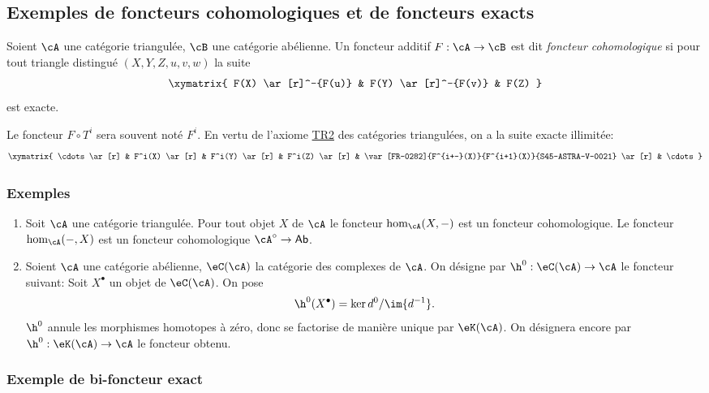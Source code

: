 \subsection{Exemples de foncteurs cohomologiques et de foncteurs exacts}\label{VIII:1-3}





\begin{definition}
Soient $\cA$ une catégorie triangulée, $\cB$ une catégorie abélienne. 
Un foncteur additif $F:\cA\to \cB$ est dit \emph{foncteur cohomologique} si 
pour tout triangle distingué $(X,Y,Z,u,v,w)$ la suite 
\[\xymatrix{
  F(X) \ar[r]^-{F(u)} 
    & F(Y) \ar[r]^-{F(v)} 
    & F(Z) 
}\]
est exacte. 
\end{definition}

Le foncteur $F\circ T^i$ sera souvent noté $F^i$. En vertu de l'axiome 
\hyperlink{VIII:TR2}{TR2} des catégories triangulées, on a la suite 
exacte illimitée: 
\[\xymatrix{
  \cdots \ar[r] 
    & F^i(X) \ar[r] 
    & F^i(Y) \ar[r] 
    & F^i(Z) \ar[r] 
    & \var[FR-0282]{F^{i+-}(X)}{F^{i+1}(X)}{S45-ASTRA-V-0021} \ar[r] 
    & \cdots 
}\]





\subsubsection{Exemples}\label{VIII:1-3-2}

\begin{enumerate}
  \item Soit $\cA$ une catégorie triangulée. Pour tout objet $X$ de $\cA$ 
    le foncteur $\hom_\cA(X,-)$ est un foncteur cohomologique. Le foncteur 
    $\hom_\cA(-,X)$ est un foncteur cohomologique $\cA^\circ\to\mathsf{Ab}$. 
  \item Soient $\cA$ une catégorie abélienne, $\eC(\cA)$ la catégorie des 
    complexes de $\cA$. On désigne par $\h^0:\eC(\cA)\to\cA$ le foncteur 
    suivant: Soit $X^\bullet$ un objet de $\eC(\cA)$. On pose 
    \[
      \h^0(X^\bullet) = \ker d^0 / \im{d^{-1}} \text{.}
    \]
    $\h^0$ annule les morphismes homotopes à zéro, donc se factorise de 
    manière unique par $\eK(\cA)$. On désignera encore par 
    $\h^0:\eK(\cA) \to \cA$ le foncteur obtenu. 
\end{enumerate}





\subsubsection{Exemple de bi-foncteur exact}\label{VIII:1-3-3}

